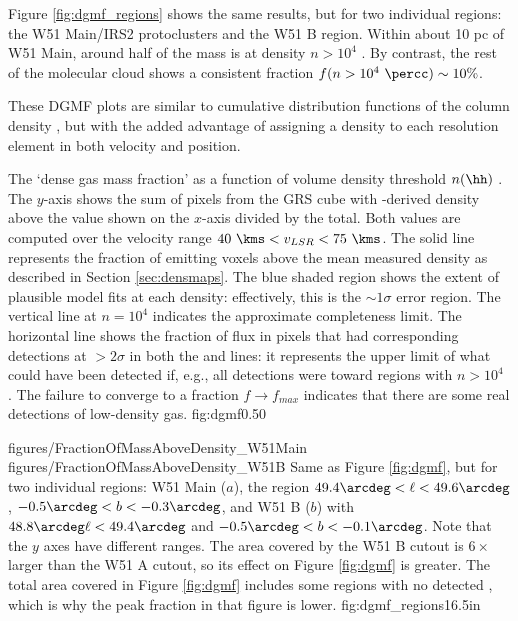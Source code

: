 Figure \ref{fig:dgmf_regions} shows the same results, but for two individual
regions: the W51 Main/IRS2 protoclusters and the W51 B region.  Within about 10 pc
of W51 Main, around half of the mass is at density $n>10^4$ \percc.  By
contrast, the rest of the molecular cloud shows a consistent fraction
$f(n>10^4~\percc) \sim10\%$.

These DGMF plots are similar to cumulative distribution functions of the column
density \citep[e.g.][Figure 6]{Battersby2014a}, but with the added advantage of
assigning a density to each resolution element in both velocity and position.

{The `dense gas mass fraction' as a function of volume density threshold
$n(\hh)$ \percc.  The $y$-axis shows the sum of \thirteenco pixels from the GRS
cube with
\formaldehyde-derived density above the value shown on the $x$-axis divided by
the total.  Both values are computed over the velocity range $40~\kms < v_{LSR}
< 75~\kms$.  The solid line represents the fraction of \thirteenco emitting
voxels above the mean measured \formaldehyde density as described in Section
\ref{sec:densmaps}.
The blue shaded region shows the extent of plausible model fits at
each density: effectively, this is the $\sim1\sigma$ error region.  The
vertical line at $n=10^4$ \percc indicates the approximate completeness limit.
The horizontal line shows the fraction of \thirteenco flux in pixels that had
corresponding detections at
$>2\sigma$ in both the \formaldehyde \oneone and \twotwo lines: it represents
the upper limit of what could have been detected if, e.g., all \formaldehyde
detections were
toward regions with $n>10^4$ \percc.  The failure to converge to a fraction
$f\rightarrow f_{max}$ indicates that there are some real detections of
low-density gas.}
{fig:dgmf}{0.5}{0}

\FigureTwoAA
{figures/FractionOfMassAboveDensity_W51Main}
{figures/FractionOfMassAboveDensity_W51B}
{Same as Figure \ref{fig:dgmf}, but for two individual regions: W51 Main
($a$), the region $49.4\arcdeg < \ell < 49.6\arcdeg$, $-0.5\arcdeg < b <
-0.3\arcdeg$, and W51 B ($b$) with $48.8\arcdeg \ell < 49.4\arcdeg$ and
$-0.5\arcdeg < b < -0.1\arcdeg$.  Note that the $y$ axes have different
ranges.  The area covered by the W51 B cutout is $6\times$ larger than
the W51 A cutout, so its effect on Figure \ref{fig:dgmf} is greater. The total
area covered in Figure \ref{fig:dgmf} includes some regions with no detected
\formaldehyde, which is why the peak fraction in that figure is lower.}
{fig:dgmf_regions}{1}{6.5in}

